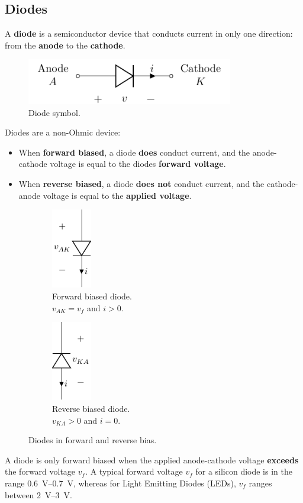 \documentclass{report}
\begin{document}
\subsection{Diodes}
A \textbf{diode} is a semiconductor device that conducts current in
only one direction: from the \textbf{anode} to the \textbf{cathode}.
\begin{figure}[H]
    \centering
    \includegraphics[height = 2cm, keepaspectratio = true]{figures/diode.pdf}
    \caption{Diode symbol.} %
\end{figure}
Diodes are a non-Ohmic device:
\begin{itemize}
    \item When \textbf{forward biased}, a diode \textbf{does} conduct current, and the anode-cathode voltage
          is equal to the diodes \textbf{forward voltage}.
    \item When \textbf{reverse biased}, a diode \textbf{does not} conduct current, and the cathode-anode voltage
          is equal to the \textbf{applied voltage}.
\end{itemize}
\begin{figure}[H]
    \centering
    \begin{subfigure}{0.47\linewidth}
        \centering
        \includegraphics[height=3.5cm]{figures/diode_forward_bias.pdf}
        \caption{Forward biased diode. \\\(v_{AK} = v_f\) and \(i > 0\).}
    \end{subfigure}
    \begin{subfigure}{0.47\linewidth}
        \centering
        \includegraphics[height=3.5cm]{figures/diode_reverse_bias.pdf}
        \caption{Reverse biased diode. \\\(v_{KA} > 0\) and \(i = 0\).}
    \end{subfigure}
    \caption{Diodes in forward and reverse bias.}
\end{figure}
A diode is only forward biased when the applied anode-cathode voltage \textbf{exceeds} the forward voltage \(v_f\).
A typical forward voltage \(v_f\) for a silicon diode is in the range \qtyrange{0.6}{0.7}{V}, whereas for
Light Emitting Diodes (LEDs), \(v_f\) ranges between \qtyrange{2}{3}{V}.
\end{document}

